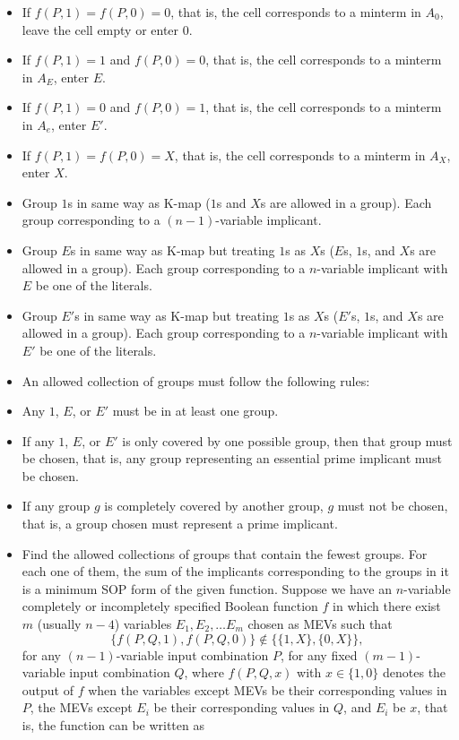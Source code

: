 \documentclass[a4paper,12pt]{article}
\begin{document}
\begin{itemize}
\begin{itemize}
\begin{itemize}
\begin{itemize}
\begin{itemize}
\begin{itemize}
\begin{itemize}
\begin{itemize}
\begin{itemize}
\item If $f(P,1)=f(P,0)=0$, that is, the cell corresponds to a minterm in $A_0$, leave the cell empty or enter $0$.
\item If $f(P,1)=1$ and $f(P,0)=0$, that is, the cell corresponds to a minterm in $A_E$, enter $E$.
\item If $f(P,1)=0$ and $f(P,0)=1$, that is, the cell corresponds to a minterm in $A_e$, enter $E'$.
\item If $f(P,1)=f(P,0)=X$, that is, the cell corresponds to a minterm in $A_X$, enter $X$.
\eit
\item Group $1$s in same way as K-map ($1$s and $X$s are allowed in a group). Each group corresponding to a $(n-1)$-variable implicant.
\item Group $E$s in same way as K-map but treating $1$s as $X$s ($E$s, $1$s, and $X$s are allowed in a group). Each group corresponding to a $n$-variable implicant with $E$ be one of the literals.
\item Group $E'$s in same way as K-map but treating $1$s as $X$s ($E'$s, $1$s, and $X$s are allowed in a group). Each group corresponding to a $n$-variable implicant with $E'$ be one of the literals.
\item An allowed collection of groups must follow the following rules:
\bit
\item Any $1$, $E$, or $E'$ must be in at least one group.
\item If any $1$, $E$, or $E'$ is only covered by one possible group, then that group must be chosen, that is, any group representing an essential prime implicant must be chosen.
\item If any group $g$ is completely covered by another group, $g$ must not be chosen, that is, a group chosen must represent a prime implicant.
\eit
\item Find the allowed collections of groups that contain the fewest groups. For each one of them, the sum of the implicants corresponding to the groups in it is a minimum SOP form of the given function.
\een
{}
Suppose we have an $n$-variable completely or incompletely specified Boolean function $f$ in which there exist $m$ (usually $n-4$) variables $E_1,E_2,\ldots E_m$ chosen as MEVs such that
\[\{f(P,Q,1),f(P,Q,0)\}\notin\{\{1,X\},\{0,X\}\},\]
for any $(n-1)$-variable input combination $P$, for any fixed $(m-1)$-variable input combination $Q$, where $f(P,Q,x)$ with $x\in\{1,0\}$ denotes the output of $f$ when the variables except MEVs be their corresponding values in $P$, the MEVs except $E_i$ be their corresponding values in $Q$, and $E_i$ be $x$, that is, the function can be written as

\end{itemize}
\end{itemize}
\end{itemize}
\end{itemize}
\end{itemize}
\end{itemize}
\end{itemize}
\end{itemize}
\end{itemize}
\end{document}
